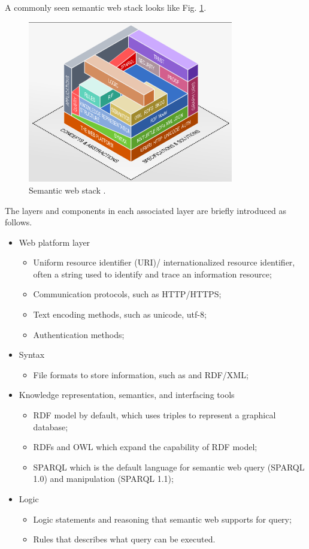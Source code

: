 A commonly seen semantic web stack looks like Fig. \ref{fig:semanticwebstack}. 

\begin{figure}[htbp]
	\centering
	\includegraphics[width=0.8\textwidth]{./chapters/ch-semanticwebbasics/figures/semanticwebstack.png}
	\caption{Semantic web stack \cite{semanticwebstack}.}
	\label{fig:semanticwebstack}
\end{figure}

The layers and components in each associated layer are briefly introduced as follows.
\begin{itemize}
	\item Web platform layer
	\begin{itemize}
		\item Uniform resource identifier (URI)/ internationalized resource identifier, often a string used to identify and trace an information resource;
		\item Communication protocols, such as HTTP/HTTPS;
		\item Text encoding methods, such as unicode, utf-8;
		\item Authentication methods;
	\end{itemize}
	\item Syntax
	\begin{itemize}
		\item File formats to store information, such as and RDF/XML;
	\end{itemize}
	\item Knowledge representation, semantics, and interfacing tools
	\begin{itemize}
		\item RDF model by default, which uses triples to represent a graphical database;
		\item RDFs and OWL which expand the capability of RDF model;
		\item SPARQL which is the default language for semantic web query (SPARQL 1.0) and manipulation (SPARQL 1.1);
	\end{itemize}
	\item Logic
	\begin{itemize}
		\item Logic statements and reasoning that semantic web supports for query;
		\item Rules that describes what query can be executed.
	\end{itemize}
\end{itemize}

